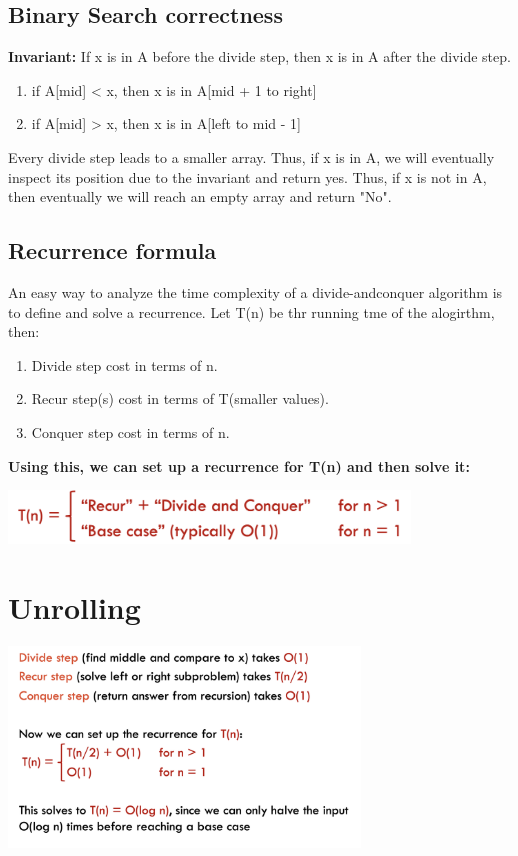 \documentclass[12pt]{article}
\newcommand{\1}{\space \quad}
\newcommand{\2}{\quad \quad \quad}
\newcommand{\3}{\quad \quad \quad \quad \space}
\newcommand{\4}{\quad \quad \quad \quad \quad \quad}
\newcommand{\5}{\quad \quad \quad \quad \quad \quad \quad \space}
\begin{document}
\subsection{Binary Search correctness}
\textbf{Invariant:} If x is in A before the divide step, then x is in A after the divide step.
\begin{enumerate}
  \item if A[mid] < x, then x is in A[mid + 1 to right]
  \item if A[mid] > x, then x is in A[left to mid - 1]
\end{enumerate}
Every divide step leads to a smaller array. Thus, if x is in A, we will eventually inspect its position due to the invariant
and return yes. Thus, if x is not in A, then eventually we will reach an empty array and return "No".

\subsection{Recurrence formula}
An easy way to analyze the time complexity of a divide-andconquer algorithm is to define and solve a recurrence.
Let T(n) be thr running tme of the alogirthm, then:
\begin{enumerate}
  \item Divide step cost in terms of n.
  \item Recur step(s) cost in terms of T(smaller values).
  \item Conquer step cost in terms of n.
\end{enumerate}

\textbf{Using this, we can set up a recurrence for T(n) and then solve it:}

\vspace{10pt}
\includegraphics[width=0.8\textwidth]{image28.png} 

\section{Unrolling}
\begin{center}
  \includegraphics[width=0.7\textwidth]{image29.png} 
\end{center}
\end{document}
